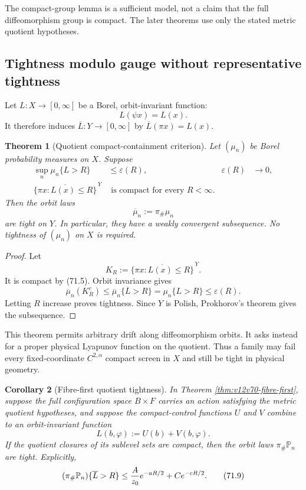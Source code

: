 \documentclass[11pt]{article}
\newtheorem{theorem}{Theorem}[section]
\newtheorem{corollary}[theorem]{Corollary}
\theoremstyle{remark}
\begin{document}
The compact-group lemma is a sufficient model, not a claim that the
full diffeomorphism group is compact.  The later theorems use only
the stated metric quotient hypotheses.

\subsection{Tightness modulo gauge without representative tightness}

Let \(L:X\to[0,\infty]\) be a Borel, orbit-invariant function:
\[
                         L(\psi x)=L(x).                      \tag{71.3}
\]
It therefore induces \(\overline L:Y\to[0,\infty]\) by
\(\overline L(\pi x)=L(x)\).

\begin{theorem}[Quotient compact-containment criterion]
\label{thm:v12v71-quotient-tight}
Let \((\mu_n)\) be Borel probability measures on \(X\).  Suppose
\begin{align}
 \sup_n\mu_n\{L>R\}&\leq\varepsilon(R),
 &\varepsilon(R)&\longrightarrow0,                           \tag{71.4}\\
 \overline{\{\pi x:L(x)\leq R\}}^{\,Y}
 &\text{ is compact for every }R<\infty.                     \tag{71.5}
\end{align}
Then the orbit laws
\[
                         \overline\mu_n:=\pi_\#\mu_n          \tag{71.6}
\]
are tight on \(Y\).  In particular, they have a weakly convergent
subsequence.  No tightness of \((\mu_n)\) on \(X\) is required.
\end{theorem}

\begin{proof}
Let
\[
 K_R:=\overline{\{\pi x:L(x)\leq R\}}^{\,Y}.
\]
It is compact by (71.5).  Orbit invariance gives
\[
 \overline\mu_n(K_R^c)
 \leq\overline\mu_n\{\overline L>R\}
 =\mu_n\{L>R\}
 \leq\varepsilon(R).                                        \tag{71.7}
\]
Letting \(R\) increase proves tightness.  Since \(Y\) is Polish,
Prokhorov's theorem gives the subsequence.
\end{proof}

This theorem permits arbitrary drift along diffeomorphism orbits.
It asks instead for a proper physical Lyapunov function on the
quotient.  Thus a family may fail every fixed-coordinate
\(C^{2,\alpha}\) compact screen in \(X\) and still be tight in
physical geometry.

\begin{corollary}[Fibre-first quotient tightness]
\label{cor:v12v71-fibre-quotient}
In Theorem \ref{thm:v12v70-fibre-first}, suppose the full
configuration space \(B\times F\) carries an action satisfying the
metric quotient hypotheses, and suppose the compact-control
functions \(U\) and \(V\) combine to an orbit-invariant function
\[
                         L(b,\varphi):=U(b)+V(b,\varphi).     \tag{71.8}
\]
If the quotient closures of its sublevel sets are compact, then the
orbit laws \(\pi_\#{\mathbb P}_n\) are tight.  Explicitly,
\begin{equation}
 (\pi_\#{\mathbb P}_n)\{\overline L>R\}
 \leq {A\over z_0}e^{-aR/2}+Ce^{-cR/2}.                     \tag{71.9}
\end{equation}
\end{corollary}
\end{document}
